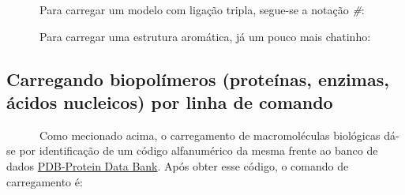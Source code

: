 \documentclass[
  letterpaper,
  DIV=11,
  numbers=noendperiod]{scrreprt}
\newenvironment{Shaded}{\begin{snugshade}}{\end{snugshade}}
\newcommand{\CommentTok}[1]{\textcolor[rgb]{0.37,0.37,0.37}{#1}}
\newcommand{\NormalTok}[1]{\textcolor[rgb]{0.00,0.23,0.31}{#1}}
\newcommand{\OtherTok}[1]{\textcolor[rgb]{0.00,0.23,0.31}{#1}}
\newcommand{\SpecialCharTok}[1]{\textcolor[rgb]{0.37,0.37,0.37}{#1}}
\begin{document}
\begin{Shaded}
\end{Shaded}

~~~~~~Para carregar um modelo com ligação tripla, segue-se a notação
\emph{\#}:

\begin{Shaded}
\end{Shaded}

~~~~~~Para carregar uma estrutura aromática, já um pouco mais chatinho:

\begin{Shaded}
\end{Shaded}

\subsection{Carregando biopolímeros (proteínas, enzimas, ácidos
nucleicos) por linha de
comando}\label{carregando-biopoluxedmeros-proteuxednas-enzimas-uxe1cidos-nucleicos-por-linha-de-comando}

~~~~~~Como mecionado acima, o carregamento de macromoléculas biológicas
dá-se por identificação de um código alfanumérico da mesma frente ao
banco de dados \href{https://www.rcsb.org/}{PDB-Protein Data Bank}. Após
obter esse código, o comando de carregamento é:

\begin{Shaded}
\end{Shaded}
\end{document}
